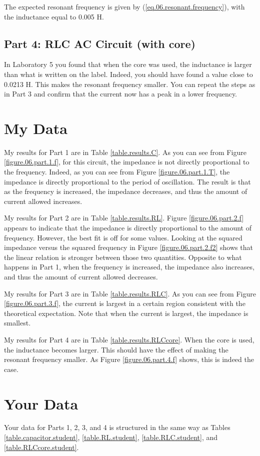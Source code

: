The expected resonant frequency is given by (\ref{eq.06.resonant.frequency}), with the inductance equal to 0.005 H.
%
\subsection{Part 4: RLC AC Circuit (with core)}
%
In Laboratory 5 you found that when the core was used, the inductance is larger than what is written on the label. Indeed, you should have found a value close to 0.0213 H. This makes the resonant frequency smaller. You can repeat the steps as in Part 3 and confirm that the current now has a peak in a lower frequency.
%
\section{My Data}
%
My results for Part 1 are in Table \ref{table.results.C}. As you can see from Figure \ref{figure.06.part.1.f}, for this circuit, the impedance is not directly proportional to the frequency. Indeed, as you can see from Figure \ref{figure.06.part.1.T}, the impedance is directly proportional to the period of oscillation. The result is that as the frequency is increased, the impedance decreases, and thus the amount of current allowed increases.

My results for Part 2 are in Table \ref{table.results.RL}. Figure \ref{figure.06.part.2.f} appears to indicate that the impedance is directly proportional to the amount of frequency. However, the best fit is off for some values. Looking at the squared impedance versus the squared frequency in Figure \ref{figure.06.part.2.f2} shows that the linear relation is stronger between those two quantities. Opposite to what happens in Part 1, when the frequency is increased, the impedance also increases, and thus the amount of current allowed decreases.

My results for Part 3 are in Table \ref{table.results.RLC}. As you can see from Figure \ref{figure.06.part.3.f}, the current is largest in a certain region consistent with the theoretical expectation. Note that when the current is largest, the impedance is smallest.

My results for Part 4 are in Table \ref{table.results.RLCcore}. When the core is used, the inductance becomes larger. This should have the effect of making the resonant frequency smaller. As Figure \ref{figure.06.part.4.f} shows, this is indeed the case.
%
\section{Your Data}
%
Your data for Parts 1, 2, 3, and 4 is structured in the same way as Tables \ref{table.capacitor.student}, \ref{table.RL.student}, \ref{table.RLC.student}, and \ref{table.RLCcore.student}.
%
\pagebreak
